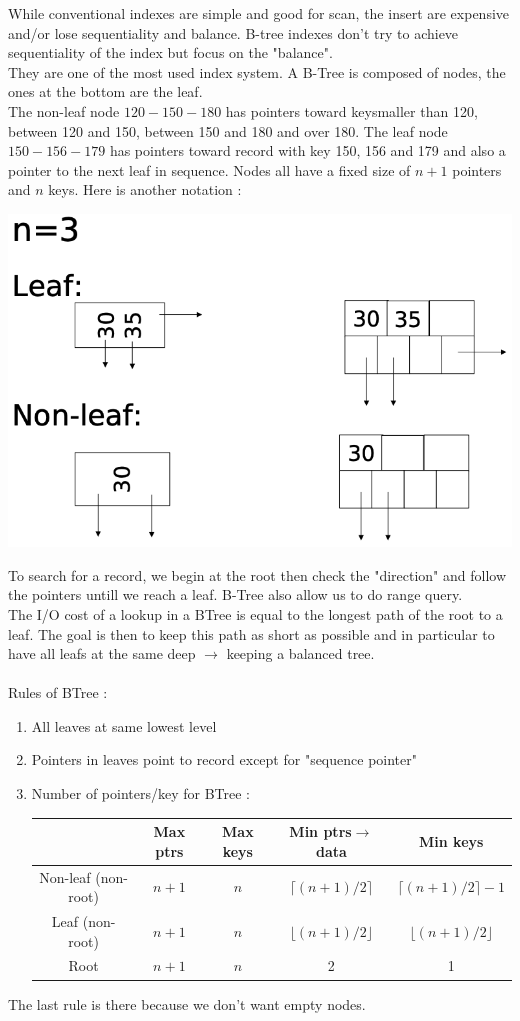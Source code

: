 \documentclass[12pt,a4paper]{article}
\begin{document}
While conventional indexes are simple and good for scan, the insert are expensive and/or lose sequentiality and balance. B-tree indexes don't try to achieve sequentiality of the index but focus on the "balance".\\
They are one of the most used index system. A B-Tree is composed of nodes, the ones at the bottom are the leaf.\\
The non-leaf node $120-150-180$ has pointers toward keysmaller than 120, between 120 and 150, between 150 and 180 and over 180. The leaf node $150-156-179$ has pointers toward record with key 150, 156 and 179 and also a pointer to the next leaf in sequence. Nodes all have a fixed size of $n+1$ pointers and $n$ keys. Here is another notation :
\begin{center}
\includegraphics[scale=0.2]{img/img36.png}
\end{center}
To search for a record, we begin at the root then check the "direction"  and follow the pointers untill we reach a leaf. B-Tree also allow us to do range query.\\
The I/O cost of a lookup in a BTree is equal to the longest path of the root to a leaf. The goal is then to keep this path as short as possible and in particular to have all leafs at the same deep $\rightarrow$ keeping a balanced tree.\\
\\
Rules of BTree :
\begin{enumerate}
\item All leaves at same lowest level
\item Pointers in leaves point to record except for "sequence pointer"
\item Number of pointers/key for BTree :\\
\begin{tabular}{c|c|c|c|c|}
&Max ptrs & Max keys & Min ptrs$\rightarrow$data & Min keys\\
\hline
Non-leaf (non-root)& $n+1$ & $n$ & $\lceil (n+1)/2 \rceil$ & $\lceil (n+1)/2 \rceil - 1$\\
\hline
Leaf (non-root)& $n+1$ & $n$ & $\lfloor (n+1)/2 \rfloor$ & $\lfloor (n+1)/2 \rfloor$\\
\hline
Root& $n+1$ & $n$ & 2 & 1\\
\hline
\end{tabular}
\end{enumerate}
The last rule is there because we don't want empty nodes.
\end{document}
